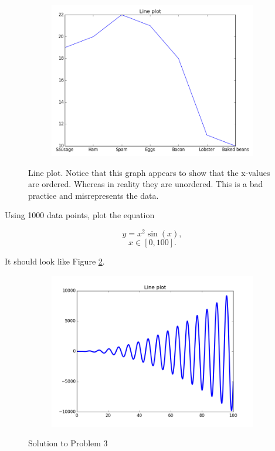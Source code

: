 \begin{figure}
\centering
\begin{subfigure}{.5\textwidth}
\centering
\includegraphics[width=\textwidth]{line_plot_bad_X.png}
\end{subfigure}
\caption{Line plot.  Notice that this graph appears to show that the x-values are ordered.  Whereas in reality they are unordered.  This is a bad practice and misrepresents the data.}
\label{fig:lineplotbadX}
\end{figure}


\begin{problem}
Using 1000 data points, plot the equation

$$y = x^2\sin(x),$$
$$x \in [0,100].$$


It should look like Figure \ref{fig:lineplot}.
\end{problem}

\begin{figure}
\centering
\begin{subfigure}{.5\textwidth}
\centering
\includegraphics[width=\textwidth]{line_plot.png}
\end{subfigure}
\caption{Solution to Problem 3}
\label{fig:lineplot}
\end{figure}


